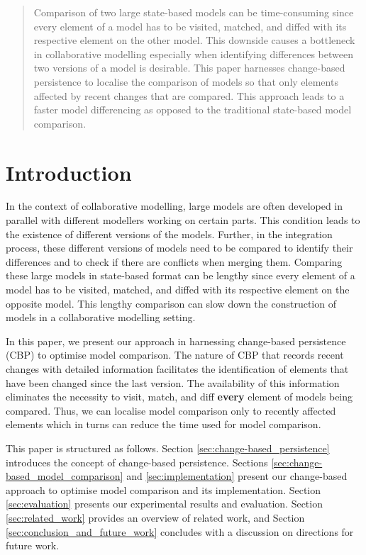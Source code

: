\documentclass{llncs}
\begin{document}
\begin{abstract}
Comparison of two large state-based models can be time-consuming since every element of a model has to be visited, matched, and diffed with its respective element on the other model. This downside causes a bottleneck in collaborative modelling especially when identifying differences between two versions of a model is desirable. This paper harnesses change-based persistence to localise the comparison of models so that only elements affected by recent changes that are compared. This approach leads to a faster model differencing as opposed to the traditional state-based model comparison. 
\end{abstract}

\vspace{-20pt}
\section{Introduction}
\label{sec:introduction}
In the context of collaborative modelling, large models are often developed in parallel with different modellers working on certain parts. This condition leads to the existence of different versions of the models. Further, in the integration process, these different versions of models need to be compared to identify their differences and to check if there are conflicts when merging them. Comparing these large models in state-based format can be lengthy since every element of a model has to be visited, matched, and diffed with its respective element on the opposite model. 
This lengthy comparison can slow down the construction of models in a collaborative modelling setting. 

In this paper, we present our approach in harnessing change-based persistence (CBP) to optimise model comparison. The nature of CBP that records recent changes with detailed information facilitates the identification of elements that have been changed since the last version. The availability of this information eliminates the necessity to visit, match, and diff \textbf{every} element of models being compared. Thus, we can localise model comparison only to recently affected elements which in turns can reduce the time used for model comparison. 

This paper is structured as follows. Section \ref{sec:change-based_persistence} introduces the concept of change-based persistence. Sections \ref{sec:change-based_model_comparison} and \ref{sec:implementation} present our change-based approach to optimise model comparison and its implementation. Section \ref{sec:evaluation} presents our experimental results and evaluation. Section \ref{sec:related_work} provides an overview of related work, and Section \ref{sec:conclusion_and_future_work} concludes with a discussion on directions for future work.
\end{document}

